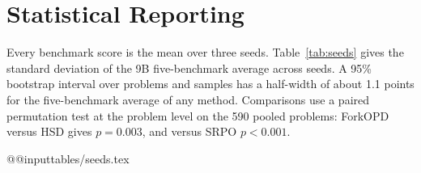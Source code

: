 \documentclass[11pt]{article}
\makeatletter
\newcommand{\method}{ForkOPD}
\newcommand{\tabinput}[1]{\csname @@input\endcsname #1 }
\theoremstyle{remark}
\makeatother
\begin{document}
\section{Statistical Reporting}
\label{app:stats}

Every benchmark score is the mean over three seeds. Table~\ref{tab:seeds} gives the standard deviation of the 9B five-benchmark average across seeds. A 95\% bootstrap interval over problems and samples has a half-width of about 1.1 points for the five-benchmark average of any method. Comparisons use a paired permutation test at the problem level on the 590 pooled problems: \method{} versus HSD gives $p=0.003$, and versus SRPO $p<0.001$.

\begin{table}[h]
\centering
\small
\tabinput{tables/seeds.tex}
\caption{Five-benchmark average on Qwen3.5-9B, mean $\pm$ standard deviation over three seeds.}
\label{tab:seeds}
\end{table}
\end{document}
